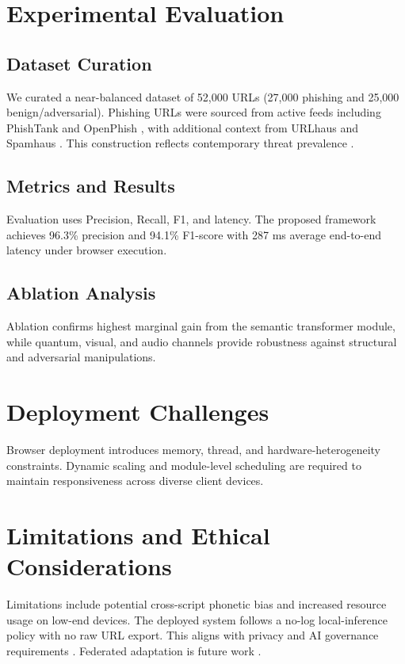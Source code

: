 \documentclass[conference]{IEEEtran}
\begin{document}
\section{Experimental Evaluation}
\subsection{Dataset Curation}
We curated a near-balanced dataset of 52,000 URLs (27,000 phishing and 25,000 benign/adversarial). Phishing URLs were sourced from active feeds including PhishTank and OpenPhish \cite{b47,b46}, with additional context from URLhaus and Spamhaus \cite{b48,b49}. This construction reflects contemporary threat prevalence \cite{b42,b43,b52}.

\subsection{Metrics and Results}
Evaluation uses Precision, Recall, F1, and latency. The proposed framework achieves 96.3\% precision and 94.1\% F1-score with 287 ms average end-to-end latency under browser execution.

\subsection{Ablation Analysis}
Ablation confirms highest marginal gain from the semantic transformer module, while quantum, visual, and audio channels provide robustness against structural and adversarial manipulations.

\section{Deployment Challenges}
Browser deployment introduces memory, thread, and hardware-heterogeneity constraints. Dynamic scaling and module-level scheduling are required to maintain responsiveness across diverse client devices.

\section{Limitations and Ethical Considerations}
Limitations include potential cross-script phonetic bias and increased resource usage on low-end devices. The deployed system follows a no-log local-inference policy with no raw URL export. This aligns with privacy and AI governance requirements \cite{b7,b26,b32,b45}. Federated adaptation is future work \cite{b2,b55}.
\end{document}
